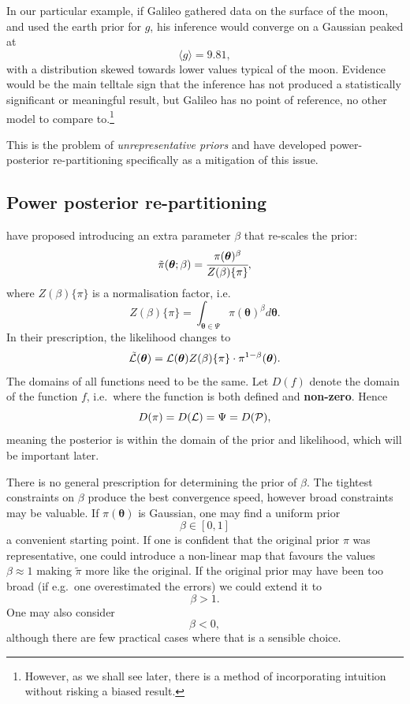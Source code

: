 \documentclass[usenatbib]{mnras}
\begin{document}
In our particular example, if Galileo gathered data on the surface of
the moon, and used the earth prior for \(g\), his inference would
converge on a Gaussian peaked at \[\langle g \rangle=9.81,\] with a
distribution skewed towards lower values typical of the moon. Evidence
would be the main telltale sign that the inference has not produced a
statistically significant or meaningful result, but Galileo has no
point of reference, no other model to compare to.\footnote{However, as we shall see later, there is a method of incorporating intuition without risking a biased result.}

This is the problem of \emph{unrepresentative priors} and
\citeauthor*{chen-ferroz-hobson} have developed power-posterior
re-partitioning specifically as a mitigation of this issue. 

\subsection{Power posterior re-partitioning}\label{sec:org68fff63}

\citeauthor{chen-ferroz-hobson} have proposed introducing an
extra parameter \(\beta\) that re-scales the prior:
\begin{equation*}
  \tilde{\pi}(\bm{\bm{\theta}};\beta) = \cfrac{\pi(\bm{\theta})^{\beta}}{Z(\beta)\{\pi\}},
\end{equation*}
where \(Z(\beta)\{\pi\}\) is a normalisation factor, i.e. 
\begin{equation*}
  Z(\beta)\{\pi\} = \int_{\bm{\theta} \in \Psi} \pi(\bm{\bm{\theta}})^{\beta}d\bm{\bm{\theta}}.
\end{equation*}
In their prescription, the likelihood changes to
\begin{equation*}
  \tilde{\cal L}(\bm{\theta}) = {\cal L}(\bm{\theta}) Z(\beta)\{\pi\} \cdot \pi^{1-\beta}(\bm{\theta}).
\end{equation*}
The domains of all functions need to be the same. Let
\(D(f)\) denote the domain of the function \(f\), i.e.~where the
function is both defined and \textbf{non-zero}. Hence
\begin{equation*}
  D(\pi) = D({\cal L}) = \Psi = D({\cal P}),
\end{equation*} 
meaning the posterior is within the domain of the prior and
likelihood, which will be important later.\label{domain-discussion}

There is no general prescription for determining the prior of
\(\beta\). The tightest constraints on \(\beta\) produce the best
convergence speed, however broad constraints may be valuable.  If
\(\pi(\bm{\theta})\) is Gaussian, one may find a uniform prior
\[\beta\in[0,1]\] a convenient starting point.  If one is confident
that the original prior \(\pi\) was representative, one could
introduce a non-linear map that favours the values \(\beta\approx1\)
making \(\tilde{\pi}\) more like the original. If the original prior
may have been too broad (if e.g.~one overestimated the errors) we
could extend it to \[\beta>1.\] One may also consider \[\beta<0,\]
although there are few practical cases where that is a sensible
choice.
\end{document}
